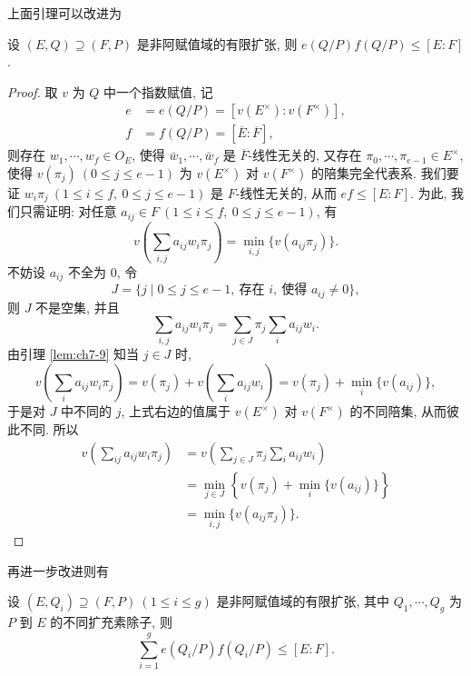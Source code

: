 上面引理可以改进为

\begin{lemma}\label{lem:ch7-10}
设 $(E,Q)\supseteq(F,P)$ 是非阿赋值域的有限扩张, 则 $e(Q/P)f(Q/P)\leqslant[E:F]$.
\end{lemma}

\begin{proof}
取 $v$ 为 $Q$ 中一个指数赋值, 记
\begin{align*}
  e&=e(Q/P)=[v(E^{\times}):v(F^{\times})],\\
  f&=f(Q/P)=[\overline{E}:\overline{F}],
\end{align*}
则存在 $w_1,\cdots,w_f\in O_E$, 使得 $\bar{w}_1,\cdots,\bar{w}_f$ 是 $\overline{F}$-线性无关的, 又存在 $\pi_0,\cdots,\pi_{e-1}\in E^{\times}$, 使得 $v(\pi_j)\ (0\leqslant j\leqslant e-1)$ 为 $v(E^{\times})$ 对 $v(F^{\times})$ 的陪集完全代表系. 我们要证 $w_i\pi_j\ (1\leqslant i\leqslant f,\ 0\leqslant j\leqslant e-1)$ 是 $F$-线性无关的, 从而 $ef\leqslant[E:F]$. 为此, 我们只需证明: 对任意 $a_{ij}\in F\ (1\leqslant i\leqslant f,\ 0\leqslant j\leqslant e-1)$, 有
\[
  v\left(\sum_{i,j}a_{ij}w_i\pi_j\right)=\min_{i,j}\{v(a_{ij}\pi_j)\}.
\]
不妨设 $a_{ij}$ 不全为 $0$, 令
\[
  J=\{j\mid 0\leqslant j\leqslant e-1,\ \text{存在 } i,\ \text{使得 } a_{ij}\neq 0\},
\]
则 $J$ 不是空集, 并且
\[
  \sum_{i,j}a_{ij}w_i\pi_j=\sum_{j\in J}\pi_j\sum_ia_{ij}w_i.
\]
由引理 \ref{lem:ch7-9} 知当 $j\in J$ 时,
\[
  v\left(\sum_ia_{ij}w_i\pi_j\right)=v(\pi_j)+v\left(\sum_ia_{ij}w_i\right)
  =v(\pi_j)+\min_i\{v(a_{ij})\},
\]
于是对 $J$ 中不同的 $j$, 上式右边的值属于 $v(E^{\times})$ 对 $v(F^{\times})$ 的不同陪集, 从而彼此不同. 所以
\begin{align*}
  v\left(\sum_{ij}a_{ij}w_i\pi_j\right)&=v\left(\sum_{j\in J}\pi_j\sum_ia_{ij}w_i\right)\\
  &=\min_{j\in J}\left\{v(\pi_j)+\min_i\{v(a_{ij})\}\right\}\\
  &=\min_{i,j}\{v(a_{ij}\pi_j)\}.
\end{align*}
\end{proof}

再进一步改进则有

\begin{theorem}\label{thm:7.5}
设 $(E,Q_i)\supseteq(F,P)\ (1\leqslant i\leqslant g)$ 是非阿赋值域的有限扩张, 其中 $Q_1,\cdots,Q_g$ 为 $P$ 到 $E$ 的不同扩充素除子, 则
\[
  \sum_{i=1}^{g}e(Q_i/P)f(Q_i/P)\leqslant[E:F].
\]
\end{theorem}

